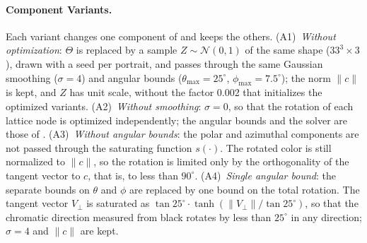 \paragraph{Component Variants.} Each variant changes one component of \capg{} and keeps the others.
(A1)~\emph{Without optimization}: $\Theta$ is replaced by a sample $Z \sim \mathcal{N}(0, 1)$ of the same shape ($33^3 \times 3$), drawn with a seed per portrait, and passes through the same Gaussian smoothing ($\sigma = 4$) and angular bounds ($\theta_{\max} = 25^\circ$, $\phi_{\max} = 7.5^\circ$); the norm $\|c\|$ is kept, and $Z$ has unit scale, without the factor 0.002 that initializes the optimized variants.
(A2)~\emph{Without smoothing}: $\sigma = 0$, so that the rotation of each lattice node is optimized independently; the angular bounds and the solver are those of \capg{}.
(A3)~\emph{Without angular bounds}: the polar and azimuthal components are not passed through the saturating function $s(\cdot)$. The rotated color is still normalized to $\|c\|$, so the rotation is limited only by the orthogonality of the tangent vector to $c$, that is, to less than $90^\circ$.
(A4)~\emph{Single angular bound}: the separate bounds on $\theta$ and $\phi$ are replaced by one bound on the total rotation. The tangent vector $V_\perp$ is saturated as $\tan 25^\circ \cdot \tanh(\|V_\perp\| / \tan 25^\circ)$, so that the chromatic direction measured from black rotates by less than $25^\circ$ in any direction; $\sigma = 4$ and $\|c\|$ are kept.

